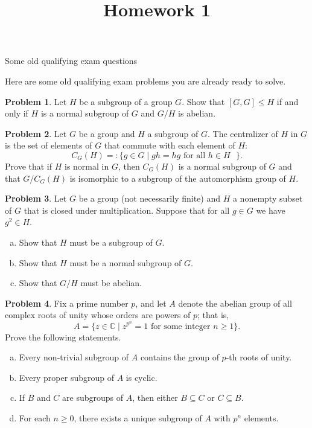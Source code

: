 \documentclass[11pt]{article}
\title{}
\date{\vspace{-0.5in}}
\title{Homework 1}
\newcommand{\C}{\mathbb{C}}
\theoremstyle{definition}
\newtheorem{problem}{Problem}
\begin{document}
\thispagestyle{fancy}
\pagestyle{fancy}

\vspace{3em}

\begin{center}
	{\LARGE  Some old qualifying exam questions}
\end{center}


Here are some old qualifying exam problems you are already ready to solve.


\vspace{2em}




\begin{problem}
Let $H$ be a subgroup of a group $G$. Show that $[G,G] \leq H$ if and only if $H$ is a normal subgroup of $G$ and $G/H$ is abelian.
\end{problem}


\begin{problem}
Let $G$ be a group and $H$ a subgroup of $G$. The centralizer of $H$ in $G$ is the set of elements of $G$ that commute with each element of $H$:
  $$
  C_G(H) =: \{g \in G \mid gh = hg \text{ for all $h \in H$ }\}.
  $$
  Prove that if $H$ is normal in $G$, then $C_G(H)$ is a normal subgroup of $G$ and that $G/C_G(H)$ is isomorphic to a subgroup of the automorphism group of $H$.
\end{problem}



\begin{problem}
Let $G$ be a group (not necessarily finite) and $H$ a nonempty subset of $G$ that is closed under multiplication. Suppose that for all $g \in G$ we have $g^2 \in H$.
\begin{enumerate}[(a)]
	\item Show that $H$ must be a subgroup of $G$.
	\item Show that $H$ must be a normal subgroup of $G$.
	\item Show that $G/H$ must be abelian.
\end{enumerate}
\end{problem}


\begin{problem}
Fix a prime number $p$, and let $A$ denote the abelian group of all complex roots of unity whose orders are powers of $p$; that is,
$$
A= \{ z \in  \C \mid z^{p^n} =1 \text{ for some integer $n \geq 1$}\}. 
$$
Prove the following statements.
\begin{enumerate}[(a)]
\item Every non-trivial subgroup of $A$ contains the group of $p$-th roots of unity.
\item Every proper subgroup of $A$ is cyclic.
\item  If $B$ and $C$ are subgroups of $A$, then either $B \subseteq C$ or $C \subseteq B$.
\item For each $n \geq 0$, there exists a unique subgroup of $A$ with $p^n$ elements.
\end{enumerate}
\end{problem}
\end{document}
